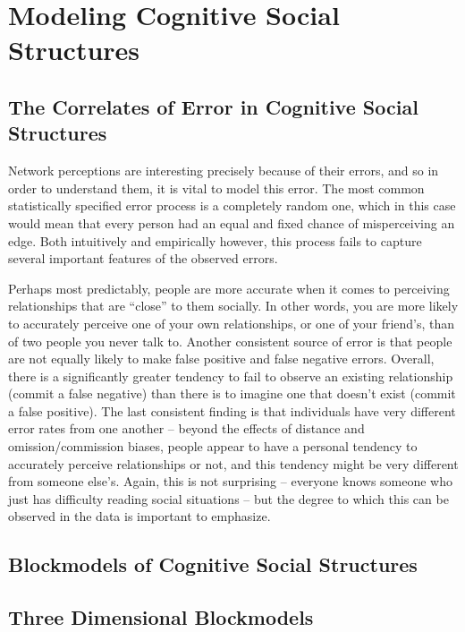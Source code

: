 \documentclass[11pt]{scrartcl}
\begin{document}
\section{Modeling Cognitive Social Structures}



\subsection{The Correlates of Error in Cognitive Social Structures}
Network perceptions are interesting precisely because of their errors, and so in order to understand them, it is vital to model this error. The most common statistically specified error process is a completely random one, which in this case would mean that every person had an equal and fixed chance of misperceiving an edge. Both intuitively and empirically however, this process fails to capture several important features of the observed errors.

Perhaps most predictably, people are more accurate when it comes to perceiving relationships that are ``close'' to them socially. In other words, you are more likely to accurately perceive one of your own relationships, or one of your friend's, than of two people you never talk to. Another consistent source of error is that people are not equally likely to make false positive and false negative errors. Overall, there is a significantly greater tendency to fail to observe an existing relationship (commit a false negative) than there is to imagine one that doesn't exist (commit a false positive). The last consistent finding is that individuals have very different error rates from one another -- beyond the effects of distance and omission/commission biases, people appear to have a personal tendency to accurately perceive relationships or not, and this tendency might be very different from someone else's. Again, this is not surprising -- everyone knows someone who just has difficulty reading social situations -- but the degree to which this can be observed in the data is important to emphasize.

\subsection{Blockmodels of Cognitive Social Structures}



\subsection{Three Dimensional Blockmodels}
\end{document}
